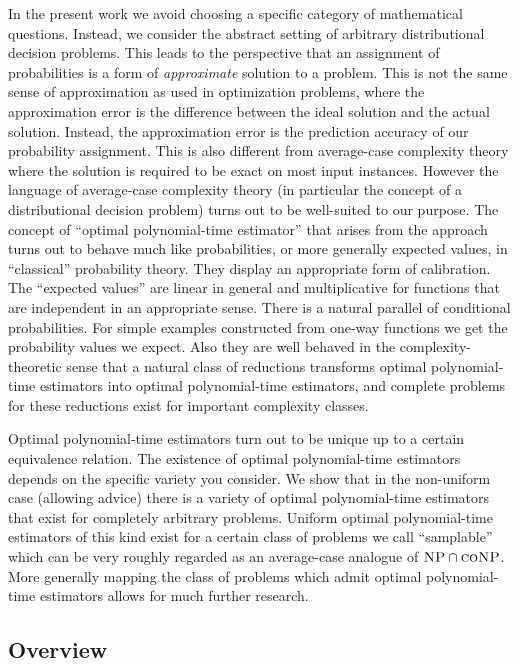 \documentclass{article}
\numberwithin{equation}{section}
\theoremstyle{definition}
\theoremstyle{plain}
\begin{document}
In the present work we avoid choosing a specific category of mathematical questions. Instead, we consider the abstract setting of arbitrary distributional decision problems. This leads to the perspective that an assignment of probabilities is a form of \emph{approximate} solution to a problem. This is not the same sense of approximation as used in optimization problems, where the approximation error is the difference between the ideal solution and the actual solution. Instead, the approximation error is the prediction accuracy of our probability assignment. This is also different from average-case complexity theory where the solution is required to be exact on most input instances. However the language of average-case complexity theory (in particular the concept of a distributional decision problem) turns out to be well-suited to our purpose.
The concept of \enquote{optimal polynomial-time estimator} that arises from the approach turns out to behave much like probabilities, or more generally expected values, in \enquote{classical} probability theory. They display an appropriate form of calibration. The \enquote{expected values} are linear in general and multiplicative for functions that are independent in an appropriate sense. There is a natural parallel of conditional probabilities. For simple examples constructed from one-way functions we get the probability values we expect. Also they are well behaved in the complexity-theoretic sense that a natural class of reductions transforms optimal polynomial-time estimators into optimal polynomial-time estimators, and complete problems for these reductions exist for important complexity classes.

Optimal polynomial-time estimators turn out to be unique up to a certain equivalence relation. The existence of optimal polynomial-time estimators depends on the specific variety you consider. We show that in the non-uniform case (allowing advice) there is a variety of optimal polynomial-time estimators that exist for completely arbitrary problems. Uniform optimal polynomial-time estimators of this kind exist for a certain class of problems we call \enquote{samplable} which can be very roughly regarded as an average-case analogue of $\textsc{NP} \cap \textsc{coNP}$. More generally mapping the class of problems which admit optimal polynomial-time estimators allows for much further research.

\subsection{Overview}
\end{document}
